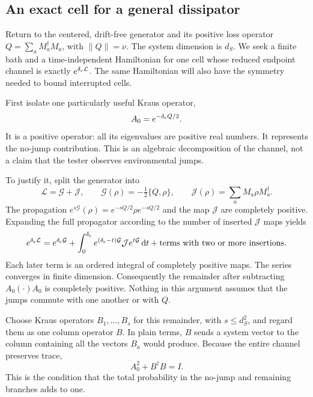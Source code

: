 \documentclass[11pt,a4paper]{article}
\numberwithin{equation}{section}
\theoremstyle{remark}
\newcommand{\dd}{\mathrm d}
\begin{document}
\subsection{An exact cell for a general dissipator}
\label{sim:general-cell}

Return to the centered, drift-free generator and its positive loss operator
$Q=\sum_a M_a^\dagger M_a$, with $\|Q\|=\nu$. The system dimension is
$d_S$. We seek a finite bath and a time-independent Hamiltonian for one cell
whose reduced endpoint channel is exactly $e^{\delta_{\rm c}\mathcal L}$. The same
Hamiltonian will also have the symmetry needed to bound interrupted cells.

First isolate one particularly useful Kraus operator,
\begin{equation}
 A_0=e^{-\delta_{\rm c}Q/2}.
 \label{sim:nojump}
\end{equation}
It is a positive operator: all its eigenvalues are positive real numbers.
It represents the no-jump contribution. This is an algebraic decomposition
of the channel, not a claim that the tester observes environmental jumps.

To justify it, split the generator into
\begin{equation}
 \mathcal L=\mathcal G+\mathcal J,\qquad
 \mathcal G(\rho)=-\tfrac12\{Q,\rho\},\qquad
 \mathcal J(\rho)=\sum_aM_a\rho M_a^\dagger.
 \label{sim:generator-split}
\end{equation}
The propagation $e^{s\mathcal G}(\rho)=e^{-sQ/2}\rho e^{-sQ/2}$
and the map $\mathcal J$ are completely positive. Expanding the full
propagator according to the number of inserted $\mathcal J$ maps yields
\begin{equation}
 e^{\delta_{\rm c}\mathcal L}=e^{\delta_{\rm c}\mathcal G}
 +\int_0^{\delta_{\rm c}} e^{(\delta_{\rm c}-t)\mathcal G}\mathcal J e^{t\mathcal G}\,\dd t
 +\text{terms with two or more insertions}.
 \label{sim:positive-expansion}
\end{equation}
Each later term is an ordered integral of completely positive maps. The
series converges in finite dimension. Consequently the remainder after
subtracting $A_0(\cdot)A_0$ is completely positive. Nothing in this
argument assumes that the jumps commute with one another or with $Q$.

Choose Kraus operators $B_1,\ldots,B_s$ for this remainder, with
$s\le d_S^2$, and regard them as one column operator $B$. In plain terms,
$B$ sends a system vector to the column containing all the vectors $B_a$
would produce. Because the entire channel preserves trace,
\begin{equation}
 A_0^2+B^\dagger B=I.
 \label{sim:column-normalization}
\end{equation}
This is the condition that the total probability in the no-jump and
remaining branches adds to one.
\end{document}

